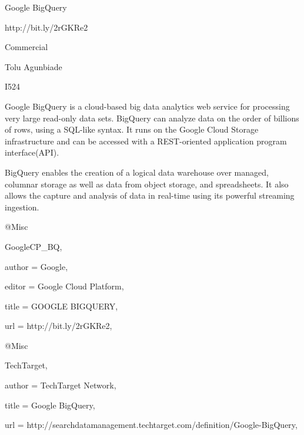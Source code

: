 Google BigQuery

http://bit.ly/2rGKRe2

Commercial

Tolu Agunbiade

I524

Google BigQuery is a cloud-based big data analytics web service for processing very large read-only data sets. BigQuery can analyze data on the order of billions of rows, using a SQL-like syntax. It runs on the Google Cloud Storage infrastructure and can be accessed with a REST-oriented application program interface(API)\cite{hid-sp18-501-TechTarget}.

BigQuery enables the creation of a logical data warehouse over managed, columnar storage as well as data from object storage, and spreadsheets. It also allows the capture and analysis of data in real-time using its powerful streaming ingestion\cite{hid-sp18-501-GoogleCP_BQ}.

@Misc{GoogleCP_BQ,

  author = {Google},

  editor = {Google Cloud Platform},

  title  = {GOOGLE BIGQUERY},

  url    = {http://bit.ly/2rGKRe2},

}


@Misc{TechTarget,

  author = {TechTarget Network},

  title  = {Google BigQuery},

  url    = {http://searchdatamanagement.techtarget.com/definition/Google-BigQuery},

}

